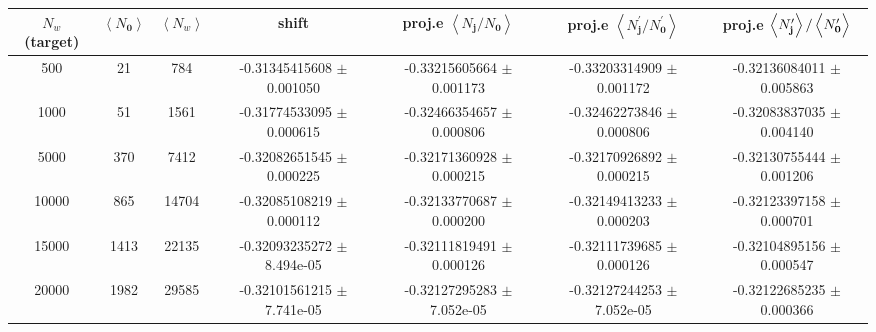 \documentclass[a4paper, 12pt]{revtex4}
\newcommand{\bj}{\mathbf{j}}
\newcommand{\bz}{\mathbf{0}}
\newcommand{\av}[1]{\left\langle#1\right\rangle}
\begin{document}
\begin{table}
\begin{ruledtabular}
\begin{tabular}{ccccccc}
$N_w$ (target)  &   $\av{N_\bz}$   &   $\av{N_w}$  &   shift          &  proj.e $\av{N_\bj/N_\bz}$    &  proj.e $\av{N_\bj^\prime/N_\bz^\prime}$ &  proj.e $\av{N_\bj^\prime}/\av{N_\bz^\prime\vphantom{N_\bj^\prime}}$ \\
\hline
          500   &     21   &    784  &  -0.31345415608 $\pm$ 0.001050  & -0.33215605664 $\pm$ 0.001173  & -0.33203314909 $\pm$ 0.001172  & -0.32136084011 $\pm$ 0.005863 \\
         1000   &     51   &   1561  &  -0.31774533095 $\pm$ 0.000615  & -0.32466354657 $\pm$ 0.000806  & -0.32462273846 $\pm$ 0.000806  & -0.32083837035 $\pm$ 0.004140 \\
         5000   &    370   &   7412  &  -0.32082651545 $\pm$ 0.000225  & -0.32171360928 $\pm$ 0.000215  & -0.32170926892 $\pm$ 0.000215  & -0.32130755444 $\pm$ 0.001206 \\
        10000   &    865   &  14704  &  -0.32085108219 $\pm$ 0.000112  & -0.32133770687 $\pm$ 0.000200  & -0.32149413233 $\pm$ 0.000203  & -0.32123397158 $\pm$ 0.000701 \\
        15000   &   1413   &  22135  &  -0.32093235272 $\pm$ 8.494e-05 & -0.32111819491 $\pm$ 0.000126  & -0.32111739685 $\pm$ 0.000126  & -0.32104895156 $\pm$ 0.000547 \\
        20000   &   1982   &  29585  &  -0.32101561215 $\pm$ 7.741e-05 & -0.32127295283 $\pm$ 7.052e-05 & -0.32127244253 $\pm$ 7.052e-05 & -0.32122685235 $\pm$ 0.000366 \\
\end{tabular}
\end{ruledtabular}
\end{table}
\end{document}
